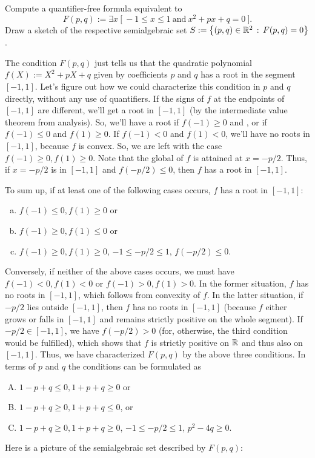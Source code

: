 \begin{exercise}
	Compute a quantifier-free formula equivalent to 
	\[
		F(p,q) := \exists x \ \bigl[ \ -1 \le x \le 1 \  \text{and} \ x^2 + p x + q = 0  \ \bigr].
	\]
	Draw a sketch of the respective semialgebraic set $S:= \left\{ (p,q) \in \mathbb{R}^2 \,:\, F(p,q) =0 \right\}$. 
\end{exercise}
\begin{solution}
	The condition $F(p,q)$ just tells us that the quadratic polynomial $f(X):=X^2 + p X + q$ given by coefficients $p$ and $q$ has a root in the segment $[-1,1]$. Let's figure out how we could characterize this condition in $p$ and $q$ directly, without any use of quantifiers. If the signs of $f$ at the endpoints of $[-1,1]$ are different, we'll get a root in $[-1,1]$ (by the intermediate value theorem from analysis). So, we'll have a root if $f(-1) \ge 0$ and , or if $f(-1) \le 0$ and $f(1) \ge 0$. If $f(-1) < 0$ and $f(1) < 0$, we'll have no roots in $[-1,1]$, because $f$ is convex. So, we are left with the case $f(-1) \ge 0, f(1) \ge 0$. Note that the global  of $f$ is attained at $x = -p/2$. Thus, if $x = -p/2$ is in $[-1,1]$ and $f(-p/2) \le 0$, then $f$ has a root in $[-1,1]$. 
	
	To sum up, if at least one of the following cases occurs, $f$ has a root in $[-1,1]$:
	\begin{enumerate}[(a)]
		\item $f(-1) \le 0, f(1) \ge 0$ or 
		\item $f(-1) \ge 0, f(1) \le 0$ or 
		\item $f(-1) \ge 0, f(1) \ge 0$, $-1 \le -p/2 \le 1$, $f(-p/2) \le 0$.
	\end{enumerate}
	Conversely, if neither of the above cases occurs, we must have $f(-1)<0, f(1) < 0$ or $f(-1) > 0, f(1) > 0$. In the former situation, $f$ has no roots in $[-1,1]$, which follows from convexity of $f$. In the latter situation, if $-p/2$ lies outside $[-1,1]$, then $f$ has no roots in $[-1,1]$ (because $f$ either grows or falls in $[-1,1]$ and remains strictly positive on the whole segment). If $-p/2 \in [-1,1]$, we have $f(-p/2) > 0$ (for, otherwise, the third condition would be fulfilled), which shows that $f$ is strictly positive on $\mathbb{R}$ and thus also on $[-1,1]$. Thus, we have characterized $F(p,q)$ by the above three conditions. In terms of $p$ and $q$ the conditions can be formulated as 
	\begin{enumerate}[(A)]
		\item $1 - p + q \le 0, 1 + p + q \ge 0$ or 
		\item $1 - p + q \ge 0, 1 + p + q \le 0$, or
		\item $1 - p+ q \ge 0, 1 + p + q \ge 0$, $-1 \le -p/2 \le 1$, $p^2 - 4 q \ge 0$. 
	\end{enumerate}
	Here is a picture of the semialgebraic set described by $F(p,q)$: 
	\begin{center}
\end{center}
\end{solution}

